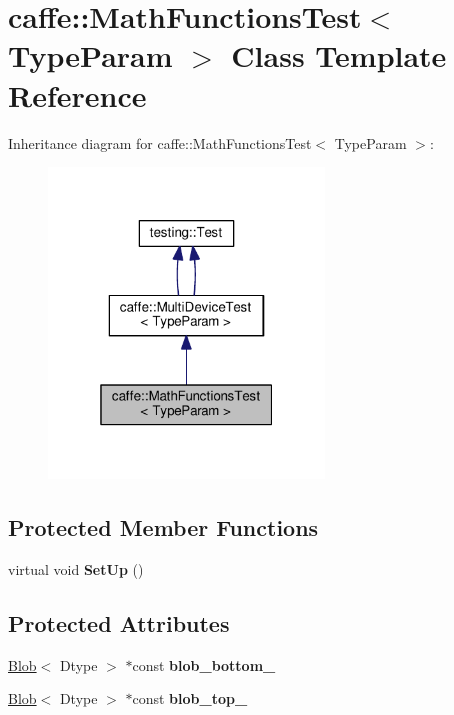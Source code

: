 \hypertarget{classcaffe_1_1_math_functions_test}{}\section{caffe\+:\+:Math\+Functions\+Test$<$ Type\+Param $>$ Class Template Reference}
\label{classcaffe_1_1_math_functions_test}


Inheritance diagram for caffe\+:\+:Math\+Functions\+Test$<$ Type\+Param $>$\+:
\nopagebreak
\begin{figure}[H]
\begin{center}
\leavevmode
\includegraphics[width=208pt]{classcaffe_1_1_math_functions_test__inherit__graph}
\end{center}
\end{figure}
\subsection*{Protected Member Functions}
\begin{DoxyCompactItemize}
\item 
\mbox{\label{classcaffe_1_1_math_functions_test_aba86156180bdb953933b40f919cc088f}} 
virtual void {\bfseries Set\+Up} ()
\end{DoxyCompactItemize}
\subsection*{Protected Attributes}
\begin{DoxyCompactItemize}
\item 
\mbox{\label{classcaffe_1_1_math_functions_test_abd3ad20bb996589cc7529288e8e763c5}} 
\mbox{\hyperlink{classcaffe_1_1_blob}{Blob}}$<$ Dtype $>$ $\ast$const {\bfseries blob\+\_\+bottom\+\_\+}
\item 
\mbox{\label{classcaffe_1_1_math_functions_test_a6940d930215243741f9bbe2f3f0e3ecf}} 
\mbox{\hyperlink{classcaffe_1_1_blob}{Blob}}$<$ Dtype $>$ $\ast$const {\bfseries blob\+\_\+top\+\_\+}
\end{DoxyCompactItemize}
